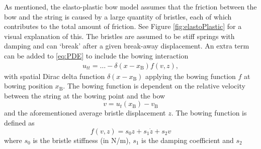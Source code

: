 \documentclass[twoside,a4paper]{article}
\begin{document}
As mentioned, the elasto-plastic bow model assumes that the friction between the bow and the string is caused by a large quantity of bristles, each of which contributes to the total amount of friction. See Figure \ref{fig:elastoPlastic} for a visual explanation of this. The bristles are assumed to be stiff springs with damping and can `break' after a given break-away displacement. An extra term can be added to \eqref{eq:PDE} to include the bowing interaction
\begin{equation}
    \begin{aligned}
    \label{eq:bowingTerm}
        u_{tt} = \hdots - \delta(x-x_\text{B})f(v, z),
    \end{aligned}
\end{equation}
with spatial Dirac delta function $\delta(x-x_\text{B})$ applying the bowing function $f$ at bowing position $x_\text{B}$. The bowing function is dependent on the relative velocity between the string at the bowing point and the bow
\begin{equation}\label{eq:relVel}
  v = u_t(x_\text{B}) - v_\text{B}
\end{equation}
and the aforementioned average bristle displacement $z$. The bowing function is defined as
\begin{equation}\label{eq:forceFunction}
    f(v, z) = s_0z + s_1\dot z + s_2v
\end{equation}
where $s_0$ is the bristle stiffness (in N/m), $s_1$ is the damping coefficient and $s_2$ 
\end{document}
